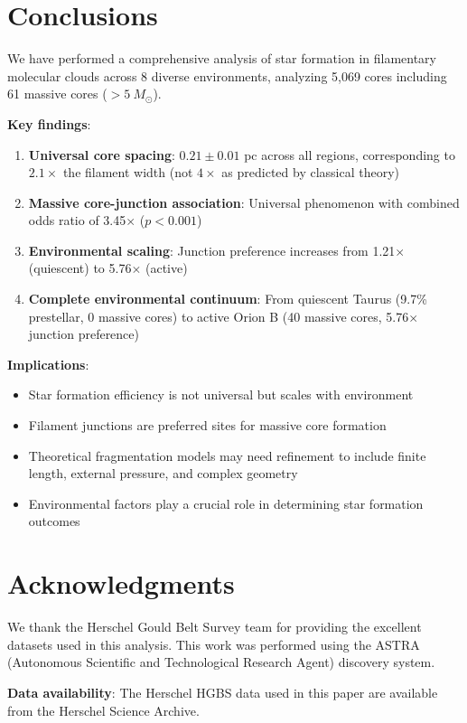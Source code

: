 \documentclass[11pt,a4paper]{article}
\begin{document}
\section{Conclusions}

We have performed a comprehensive analysis of star formation in filamentary molecular clouds across 8 diverse environments, analyzing 5,069 cores including 61 massive cores ($>5~M_\odot$).

\textbf{Key findings}:
\begin{enumerate}
    \item \textbf{Universal core spacing}: $0.21 \pm 0.01$ pc across all regions, corresponding to $2.1\times$ the filament width (not $4\times$ as predicted by classical theory)
    \item \textbf{Massive core-junction association}: Universal phenomenon with combined odds ratio of 3.45$\times$ ($p < 0.001$)
    \item \textbf{Environmental scaling}: Junction preference increases from 1.21$\times$ (quiescent) to 5.76$\times$ (active)
    \item \textbf{Complete environmental continuum}: From quiescent Taurus (9.7\% prestellar, 0 massive cores) to active Orion B (40 massive cores, 5.76$\times$ junction preference)
\end{enumerate}

\textbf{Implications}:
\begin{itemize}
    \item Star formation efficiency is not universal but scales with environment
    \item Filament junctions are preferred sites for massive core formation
    \item Theoretical fragmentation models may need refinement to include finite length, external pressure, and complex geometry
    \item Environmental factors play a crucial role in determining star formation outcomes
\end{itemize}

\section*{Acknowledgments}

We thank the Herschel Gould Belt Survey team for providing the excellent datasets used in this analysis. This work was performed using the ASTRA (Autonomous Scientific and Technological Research Agent) discovery system.

\textbf{Data availability}: The Herschel HGBS data used in this paper are available from the Herschel Science Archive.
\end{document}
